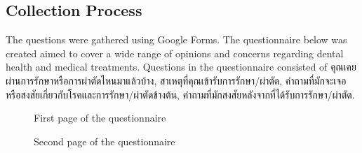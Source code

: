 \documentclass[12pt,oneside,openright,a4paper]{cpe-english-project}
\begin{document}
    \subsection{Collection Process}
      \qquad The questions were gathered using Google Forms. The questionnaire below was created aimed to cover a wide range of opinions and concerns regarding dental health and medical treatments. Questions in the questionnaire consisted of \textthai{คุณเคยผ่านการรักษาหรือการผ่าตัดไหนมาแล้วบ้าง, สาเหตุที่คุณเข้ารับการรักษา/ผ่าตัด, คำถามที่มักจะเจอหรือสงสัยเกี่ยวกับโรคและการรักษา/ผ่าตัดข้างต้น, คำถามที่มักสงสัยหลังจากที่ได้รับการรักษา/ผ่าตัด.} \par
      \begin{figure}[!h]
        \centering
        \caption{First page of the questionnaire}\label{fig:Survey_1}
      \end{figure}
      \begin{figure}[!h]
        \centering
        \caption{Second page of the questionnaire}\label{fig:Survey_2}
      \end{figure}
\end{document}
